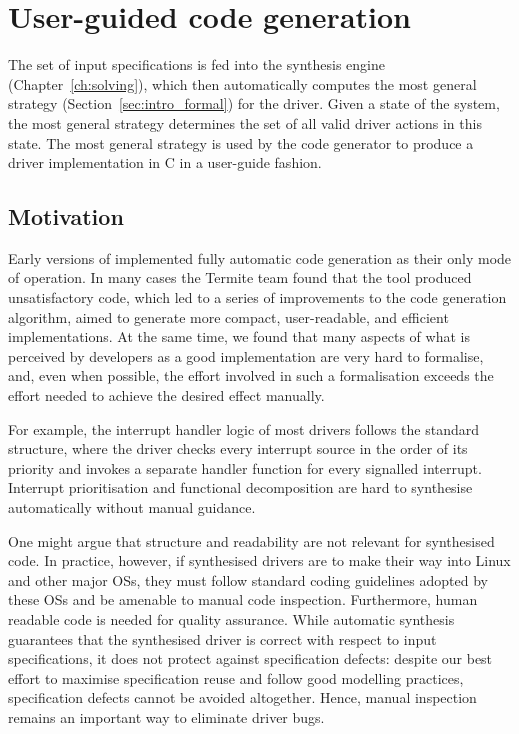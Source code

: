 \section{User-guided code generation}
\label{s:user-guided}

The set of input \tsl specifications is fed into the \termite synthesis engine (Chapter~\ref{ch:solving}), which then automatically computes the most general strategy (Section~\ref{sec:intro_formal}) for the driver.  Given a state of the system, the most general strategy determines the set of all valid driver actions in this state.  The most general strategy is used by the \termite code generator to produce a driver implementation in C in a user-guide fashion.

\subsection{Motivation}

Early versions of \termite implemented fully automatic code generation as their only mode of operation.  In many cases the Termite team found that the tool produced unsatisfactory code, which led to a series of improvements to the code generation algorithm, aimed to generate more compact, user-readable, and efficient implementations.  At the same time, we found that many aspects of what is perceived by developers as a good implementation are very hard to formalise, and, even when possible, the effort involved in such a formalisation exceeds the effort needed to achieve the desired effect manually.

For example, the interrupt handler logic of most drivers follows the standard structure, where the driver checks every interrupt source in the order of its priority and invokes a separate handler function for every signalled interrupt.  Interrupt prioritisation and functional decomposition are hard to synthesise automatically without manual guidance.

One might argue that structure and readability are not relevant for synthesised code.  In practice, however, if synthesised drivers are to make their way into Linux and other major OSs, they must follow standard coding guidelines adopted by these OSs and be amenable to manual code inspection.  Furthermore, human readable code is needed for quality assurance.  While automatic synthesis guarantees that the synthesised driver is correct with respect to input specifications, it does not protect against specification defects: despite our best effort to maximise specification reuse and follow good modelling practices, specification defects cannot be avoided altogether.  Hence, manual inspection remains an important way to eliminate driver bugs.

